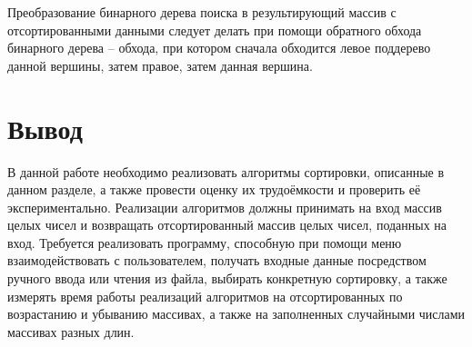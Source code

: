 Преобразование бинарного дерева поиска в результирующий массив с отсортированными данными следует делать при помощи обратного обхода бинарного дерева -- обхода, при котором сначала обходится левое поддерево данной вершины, затем правое, затем данная вершина.


\section*{Вывод}
В данной работе необходимо реализовать алгоритмы сортировки, описанные в данном разделе, а также провести оценку их трудоёмкости и проверить её экспериментально. Реализации алгоритмов должны принимать на вход массив целых чисел и возвращать отсортированный массив целых чисел, поданных на вход. Требуется реализовать программу, способную при помощи меню взаимодействовать с пользователем, получать входные данные посредством ручного ввода или чтения из файла, выбирать конкретную сортировку, а также измерять время работы реализаций алгоритмов на отсортированных по возрастанию и убыванию массивах, а также на заполненных случайными числами массивах разных длин.